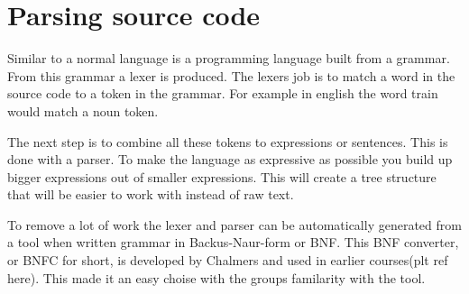 \section{Parsing source code} \label{sec:bnfc}
Similar to a normal language is a programming language built from a grammar. 
From this grammar a lexer is produced. The lexers job is to match a word in the
source code to a token in the grammar. For example in english the word train 
would match a noun token. 

The next step is to combine all these tokens to expressions or sentences. This
is done with a parser. To make the language as expressive as possible you build
up bigger expressions out of smaller expressions. This will create a tree
structure that will be easier to work with instead of raw text. 

To remove a lot of work the lexer and parser can be automatically generated from
a tool when written grammar in Backus-Naur-form or BNF. This BNF converter, or
BNFC for short, is developed by Chalmers and used in earlier courses(plt ref here).
This made it an easy choise with the groups familarity with the tool. 


